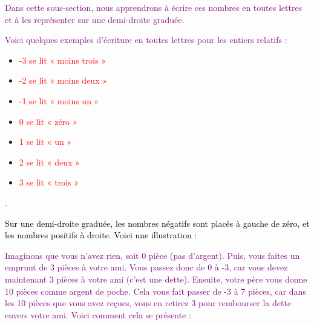 \documentclass{article}
\begin{document}
\textcolor{purple}{Dans cette sous-section, nous apprendrons à écrire ces nombres en toutes lettres et à les représenter sur une demi-droite graduée.}

\vspace{0.4cm}

\begin{tcolorbox}[colback=orange!10!white, colframe=orange!75!black, title=\textcolor{white}{Exemples}, sharp corners=southwest]
\textcolor{purple}{Voici quelques exemples d'écriture en toutes lettres pour les entiers relatifs :}

\begin{itemize}
    \item \textcolor{red}{-3 se lit « moins trois »}
    \item \textcolor{red}{-2 se lit « moins deux »}
    \item \textcolor{red}{-1 se lit « moins un »}
    \item \textcolor{red}{0 se lit « zéro »}
    \item \textcolor{red}{1 se lit « un »}
    \item \textcolor{red}{2 se lit « deux »}
    \item \textcolor{red}{3 se lit « trois »}
\end{itemize}.
\end{tcolorbox}

\begin{tcolorbox}[colback=cyan!10!white, colframe=lime!75!black, title=\textcolor{black}{Remarque}, 
                  sharp corners=southwest]
\textcolor{black}{Sur une demi-droite graduée, les nombres négatifs sont placés à gauche de zéro, et les nombres positifs à droite. Voici une illustration :}

\begin{center}
\end{center}

\end{tcolorbox}

\vspace{0.5cm}

\textcolor{purple}{Imaginons que vous n'avez rien, soit 0 pièce (pas d'argent). Puis, vous faites un emprunt de 3 pièces à votre ami. Vous passez donc de 0 à -3, car vous devez maintenant 3 pièces à votre ami (c'est une dette). Ensuite, votre père vous donne 10 pièces comme argent de poche. Cela vous fait passer de -3 à 7 pièces, car dans les 10 pièces que vous avez reçues, vous en retirez 3 pour rembourser la dette envers votre ami. Voici comment cela se présente :}
\end{document}
